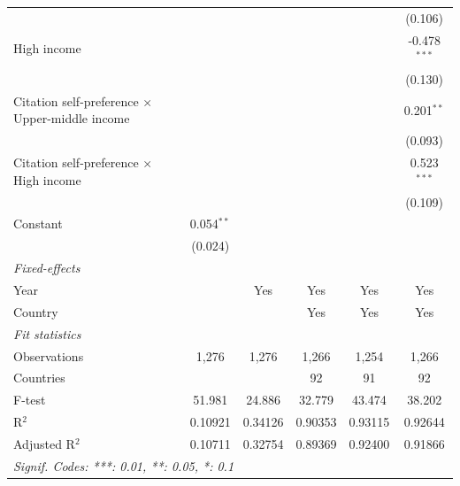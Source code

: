 \begin{table}[H]
\begin{tabular}{lccccc}
                                                        &                &                &                &                & (0.106)\\   
      High income                                       &                &                &                &                & -0.478$^{***}$\\   
                                                        &                &                &                &                & (0.130)\\   
      Citation self-preference × Upper-middle income    &                &                &                &                & 0.201$^{**}$\\   
                                                        &                &                &                &                & (0.093)\\   
      Citation self-preference × High income            &                &                &                &                & 0.523$^{***}$\\   
                                                        &                &                &                &                & (0.109)\\   
      Constant                                          & 0.054$^{**}$   &                &                &                &   \\   
                                                        & (0.024)        &                &                &                &   \\   
      \midrule
      \emph{Fixed-effects}\\
      Year                                              &                & Yes            & Yes            & Yes            & Yes\\  
      Country                                           &                &                & Yes            & Yes            & Yes\\  
      \midrule
      \emph{Fit statistics}\\
      Observations                                      & 1,276          & 1,276          & 1,266          & 1,254          & 1,266\\  
      Countries                                         &                &                & 92             & 91             & 92\\  
      F-test                                            & 51.981         & 24.886         & 32.779         & 43.474         & 38.202\\  
      R$^2$                                             & 0.10921        & 0.34126        & 0.90353        & 0.93115        & 0.92644\\  
      Adjusted R$^2$                                    & 0.10711        & 0.32754        & 0.89369        & 0.92400        & 0.91866\\  
      \midrule \midrule
      \multicolumn{6}{l}{\emph{Signif. Codes: ***: 0.01, **: 0.05, *: 0.1}}\\
   \end{tabular}
\end{table}


